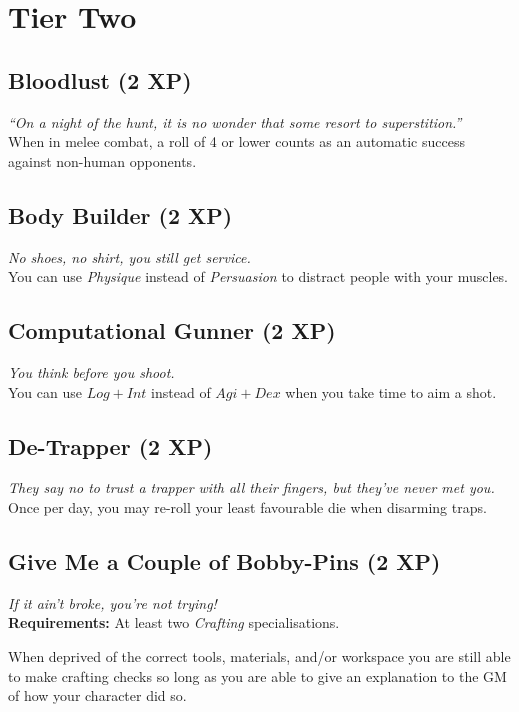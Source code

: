 \section{Tier Two}

\subsection*{Bloodlust (2 XP)}
\textit{``On a night of the hunt, it is no wonder that some resort to superstition.''}\\
When in melee combat, a roll of 4 or lower counts as an automatic success against non-human opponents.

\subsection*{Body Builder (2 XP)}
\textit{No shoes, no shirt, you still get service.}\\
You can use \textit{Physique} instead of \textit{Persuasion} to distract people with your muscles.

\subsection*{Computational Gunner (2 XP)}
\textit{You think before you shoot.}\\
You can use $Log+Int$ instead of $Agi+Dex$ when you take time to aim a shot.

\subsection*{De-Trapper (2 XP)}
\textit{They say no to trust a trapper with all their fingers, but they've never met you.}\\
Once per day, you may re-roll your least favourable die when disarming traps.

\subsection*{Give Me a Couple of Bobby-Pins (2 XP)}
\textit{If it ain't broke, you're not trying!}\\
\textbf{Requirements:} At least two \textit{Crafting} specialisations.

When deprived of the correct tools, materials, and/or workspace you are still able to make crafting checks so long as you are able to give an explanation to the GM of how your character did so.

